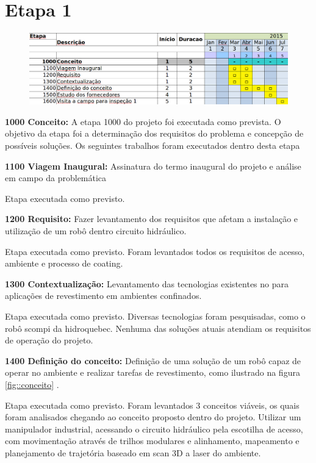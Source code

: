 

\section{Etapa 1}

\begin{figure}[H]
\centering
\includegraphics[width=0.9\columnwidth]{figs/etapa1}
\end{figure} 

\textbf{1000 Conceito:} A etapa 1000 do projeto foi executada como prevista. O
objetivo da etapa foi a determinação dos requisitos do problema e concepção de
possíveis soluções. Os seguintes trabalhos foram executados dentro desta etapa

\noindent
\textbf{1100 Viagem Inaugural:} Assinatura do termo inaugural do projeto e
análise em campo da problemática

Etapa executada como previsto. 


\noindent
\textbf{1200 Requisito:} Fazer levantamento dos requisitos que afetam a
instalação e utilização de um robô dentro circuito hidráulico.

Etapa executada como previsto. Foram levantados todos os requisitos de acesso,
ambiente e processo de coating.

\noindent
\textbf{1300 Contextualização:} Levantamento das tecnologias existentes no para
aplicações de revestimento em ambientes confinados.

Etapa executada como previsto. Diversas tecnologias foram pesquisadas, como o
robô scompi da hidroquebec. Nenhuma das soluções atuais atendiam os requisitos
de operação do projeto.

\noindent
\textbf{1400 Definição do conceito:} Definição de uma solução de um robô capaz
de operar no ambiente e realizar tarefas de revestimento, como ilustrado na
figura \ref{fig::conceito}				 .

Etapa executada como previsto. Foram levantados 3 conceitos viáveis, os quais
foram analisados chegando ao conceito proposto dentro do projeto. Utilizar um
manipulador industrial, acessando o circuito hidráulico pela escotilha de
acesso, com movimenta\-ção através de trilhos modulares e alinhamento,
mapeamento e planejamento de trajetória baseado em scan 3D a laser do ambiente.

